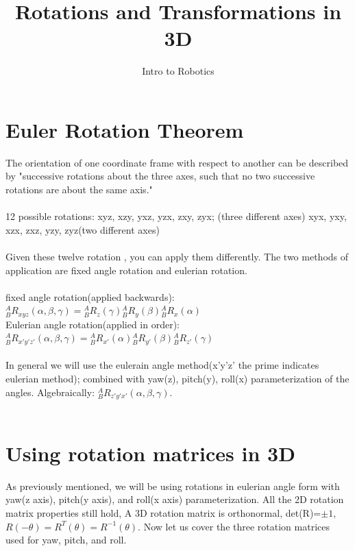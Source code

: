\documentclass{article}
\title{Rotations and Transformations in 3D}
\author{Intro to Robotics}
\date{}
\begin{document}
\maketitle
\section{Euler Rotation Theorem}
The orientation of one coordinate frame with respect to another can be described by "successive  rotations about the three axes, such that no two successive rotations are about the same axis." \\\\
12 possible rotations: xyz, xzy, yxz, yzx, zxy, zyx; (three different axes) xyx, yxy, xzx, zxz, yzy, zyz(two different axes) \\\\
Given these twelve rotation , you can apply them differently. The two methods of application are fixed angle rotation and eulerian rotation.\\\\
fixed angle rotation(applied backwards):  ${}^{A}_{B}R_{xyz}(\alpha,\beta,\gamma)={}^{A}_{B}R_z(\gamma){}^{A}_{B}R_y(\beta){}^{A}_{B}R_x(\alpha)$\\
Eulerian angle rotation(applied in order): ${}^{A}_{B}R_{x'y'z'}(\alpha,\beta,\gamma)={}^{A}_{B}R_{x'}(\alpha){}^{A}_{B}R_{y'}(\beta){}^{A}_{B}R_{z'}(\gamma)$\\\\

In general we will use the eulerain angle method(x'y'z' the prime indicates eulerian method); combined with  yaw(z), pitch(y), roll(x) parameterization of the angles. Algebraically: ${}^{A}_{B}R_{z'y'x'}(\alpha,\beta,\gamma)$.\\\\
\newpage
\section{Using rotation matrices in 3D}
As previously mentioned, we will be using rotations in eulerian angle form with yaw(z axis), pitch(y axis), and roll(x axis) parameterization. All the 2D rotation matrix properties still hold, A 3D rotation matrix is orthonormal, det(R)=$\pm1$, $R(-\theta)=R^T(\theta)=R^{-1}(\theta)$. Now let us cover the three rotation matrices used for yaw, pitch, and roll.\\
\end{document}
